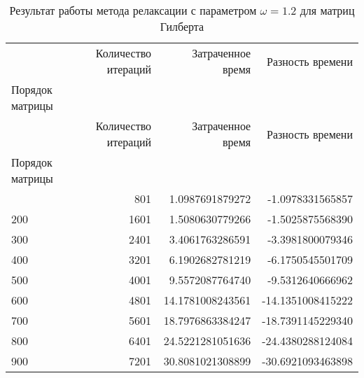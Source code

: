 \begin{longtable}{lrrr}
\caption{Результат работы метода релаксации с параметром $\omega=1.2$ для матриц Гилберта}\\
\toprule
 & Количество итераций & Затраченное время & Разность времени \\
Порядок матрицы &  &  &  \\
\midrule
\endfirsthead
\toprule
 & Количество итераций & Затраченное время & Разность времени \\
Порядок матрицы &  &  &  \\
\midrule
\endhead
\midrule
\endfoot
\bottomrule
\endlastfoot
100 & 801 & 1.0987691879272 & -1.0978331565857 \\
200 & 1601 & 1.5080630779266 & -1.5025875568390 \\
300 & 2401 & 3.4061763286591 & -3.3981800079346 \\
400 & 3201 & 6.1902682781219 & -6.1750545501709 \\
500 & 4001 & 9.5572087764740 & -9.5312640666962 \\
600 & 4801 & 14.1781008243561 & -14.1351008415222 \\
700 & 5601 & 18.7976863384247 & -18.7391145229340 \\
800 & 6401 & 24.5221281051636 & -24.4380288124084 \\
900 & 7201 & 30.8081021308899 & -30.6921093463898 \\
\end{longtable}
